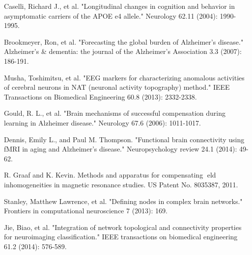 \documentclass[preprint,12pt]{elsarticle}
\begin{document}
\begin{thebibliography}{1}
		
			Caselli, Richard J., et al. "Longitudinal changes in cognition and behavior in asymptomatic carriers of the APOE e4 allele." Neurology 62.11 (2004): 1990-1995.
			
			Brookmeyer, Ron, et al. "Forecasting the global burden of Alzheimer’s disease." Alzheimer's \& dementia: the journal of the Alzheimer's Association 3.3 (2007): 186-191.
			
			Musha, Toshimitsu, et al. "EEG markers for characterizing anomalous activities of cerebral neurons in NAT (neuronal activity topography) method." IEEE Transactions on Biomedical Engineering 60.8 (2013): 2332-2338.
			
			Gould, R. L., et al. "Brain mechanisms of successful compensation during learning in Alzheimer disease." Neurology 67.6 (2006): 1011-1017.
			
			Dennis, Emily L., and Paul M. Thompson. "Functional brain connectivity using fMRI in aging and Alzheimer’s disease." Neuropsychology review 24.1 (2014): 49-62.
			
			
			
			R. Graaf and K. Kevin. Methods and apparatus for
			compensating eld inhomogeneities in magnetic resonance
			studies. US Patent No. 8035387, 2011.
			
			
			Stanley, Matthew Lawrence, et al. "Defining nodes in complex brain networks." Frontiers in computational neuroscience 7 (2013): 169.
			
			Jie, Biao, et al. "Integration of network topological and connectivity properties for neuroimaging classification." IEEE transactions on biomedical engineering 61.2 (2014): 576-589.
			

\end{thebibliography}
\end{document}
